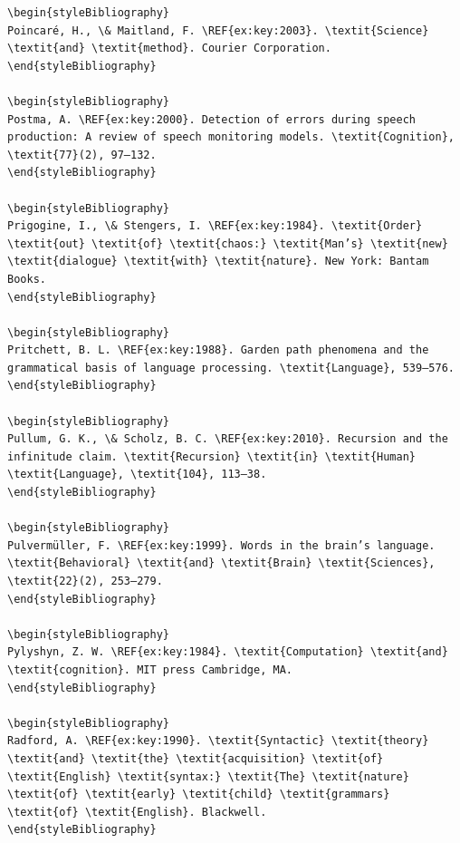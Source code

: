 \begin{verbatim}
\begin{styleBibliography}
Poincaré, H., \& Maitland, F. \REF{ex:key:2003}. \textit{Science} \textit{and} \textit{method}. Courier Corporation.
\end{styleBibliography}

\begin{styleBibliography}
Postma, A. \REF{ex:key:2000}. Detection of errors during speech production: A review of speech monitoring models. \textit{Cognition}, \textit{77}(2), 97–132.
\end{styleBibliography}

\begin{styleBibliography}
Prigogine, I., \& Stengers, I. \REF{ex:key:1984}. \textit{Order} \textit{out} \textit{of} \textit{chaos:} \textit{Man’s} \textit{new} \textit{dialogue} \textit{with} \textit{nature}. New York: Bantam Books.
\end{styleBibliography}

\begin{styleBibliography}
Pritchett, B. L. \REF{ex:key:1988}. Garden path phenomena and the grammatical basis of language processing. \textit{Language}, 539–576.
\end{styleBibliography}

\begin{styleBibliography}
Pullum, G. K., \& Scholz, B. C. \REF{ex:key:2010}. Recursion and the infinitude claim. \textit{Recursion} \textit{in} \textit{Human} \textit{Language}, \textit{104}, 113–38.
\end{styleBibliography}

\begin{styleBibliography}
Pulvermüller, F. \REF{ex:key:1999}. Words in the brain’s language. \textit{Behavioral} \textit{and} \textit{Brain} \textit{Sciences}, \textit{22}(2), 253–279.
\end{styleBibliography}

\begin{styleBibliography}
Pylyshyn, Z. W. \REF{ex:key:1984}. \textit{Computation} \textit{and} \textit{cognition}. MIT press Cambridge, MA.
\end{styleBibliography}

\begin{styleBibliography}
Radford, A. \REF{ex:key:1990}. \textit{Syntactic} \textit{theory} \textit{and} \textit{the} \textit{acquisition} \textit{of} \textit{English} \textit{syntax:} \textit{The} \textit{nature} \textit{of} \textit{early} \textit{child} \textit{grammars} \textit{of} \textit{English}. Blackwell.
\end{styleBibliography}


\end{verbatim}

